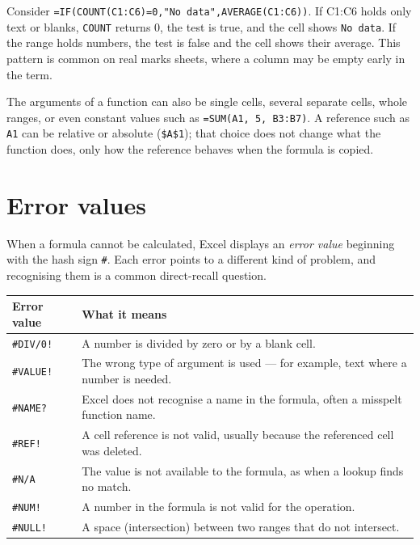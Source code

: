 \begin{example}
Consider \texttt{=IF(COUNT(C1:C6)=0,"No data",AVERAGE(C1:C6))}. If C1:C6 holds
only text or blanks, \texttt{COUNT} returns 0, the test is true, and the cell
shows \texttt{No data}. If the range holds numbers, the test is false and the
cell shows their average. This pattern is common on real marks sheets, where a
column may be empty early in the term.
\end{example}

The arguments of a function can also be single cells, several separate cells,
whole ranges, or even constant values such as \texttt{=SUM(A1, 5, B3:B7)}. A
reference such as \texttt{A1} can be relative or absolute (\texttt{\$A\$1});
that choice does not change what the function does, only how the reference
behaves when the formula is copied.

\section{Error values}
When a formula cannot be calculated, Excel displays an \emph{error value}
beginning with the hash sign \texttt{\#}. Each error points to a different
kind of problem, and recognising them is a common direct-recall question.

\begin{center}
\begin{tabular}{p{}p{}}
\toprule
\textbf{Error value} & \textbf{What it means} \\
\midrule
\texttt{\#DIV/0!} & A number is divided by zero or by a blank cell. \\
\texttt{\#VALUE!} & The wrong type of argument is used --- for example, text where a number is needed. \\
\texttt{\#NAME?} & Excel does not recognise a name in the formula, often a misspelt function name. \\
\texttt{\#REF!} & A cell reference is not valid, usually because the referenced cell was deleted. \\
\texttt{\#N/A} & The value is not available to the formula, as when a lookup finds no match. \\
\texttt{\#NUM!} & A number in the formula is not valid for the operation. \\
\texttt{\#NULL!} & A space (intersection) between two ranges that do not intersect. \\
\bottomrule
\end{tabular}
\end{center}


